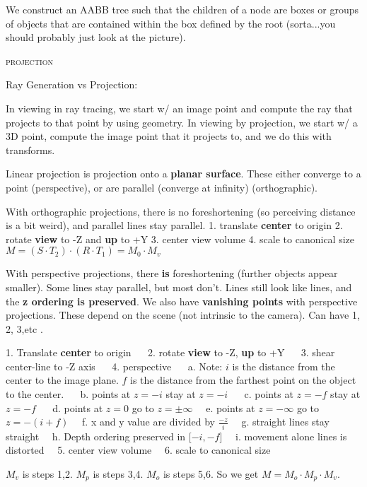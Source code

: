 \documentclass{article}
\begin{document}
We construct an AABB tree such that the children of a node are boxes or groups of objects that are contained within the box defined by the root (sorta...you should probably just look at the picture).
\begin{center}\textsc{projection}\end{center} 
Ray Generation vs Projection:

In viewing in ray tracing, we start w/ an image point and compute the ray that projects to that point by using geometry.
In viewing by projection, we start w/ a 3D point, compute the image point that it projects to, and we do this with transforms.

Linear projection is projection onto a {\bf planar surface}. These either converge to a point (perspective), or are parallel (converge at infinity) (orthographic). 

With orthographic projections, there is no foreshortening (so perceiving distance is a bit weird), and parallel lines stay parallel.
	1. translate \textbf{center} to origin
	2. rotate {\bf view} to -Z and {\bf up} to +Y
 	3. center view volume
	4. scale to canonical size
$M=(S\cdot T_2)\cdot(R\cdot T_1) = M_0\cdot M_v$
\vspace{10pt}

With perspective projections, there {\bf is} foreshortening (further objects appear smaller). Some lines stay parallel, but most don't. Lines still look like lines, and the {\bf z ordering is preserved}. We also have {\bf vanishing points} with perspective projections. These depend on the scene (not intrinsic to the camera). Can have 1, 2, 3,etc .

	1. Translate {\bf center}  to origin $\quad$
	2. rotate {\bf view} to -Z, {\bf up} to +Y $\quad$
	3. shear center-line to -Z axis $\quad$
	4. perspective $\quad$
		a. Note: $i$ is the distance from the center to the image plane. $f$ is the distance from the farthest point on the object to the center. $\quad$
		b. points at $z=-i$ stay at $z=-i$ $\quad$
		c. points at $z=-f$ stay at $z=-f$ $\quad$
		d. points at $z=0$ go to $z=\pm\infty$$\quad$
		e. points at $z=-\infty$ go to $z=-(i+f)$$\quad$
		f. x and y value are divided by $\frac{-z}{i} $$\quad$
		g. straight lines stay straight$\quad$
		h. Depth ordering preserved in [$-i,-f$]$\quad$
		i. movement alone lines is distorted$\quad$
	5. center view volume$\quad$
	6. scale to canonical size$\quad$

$M_v$ is steps 1,2. $M_p$ is steps 3,4. $M_o$ is steps 5,6. So we get $M=M_o\cdot M_p\cdot M_v$.
\end{document}
